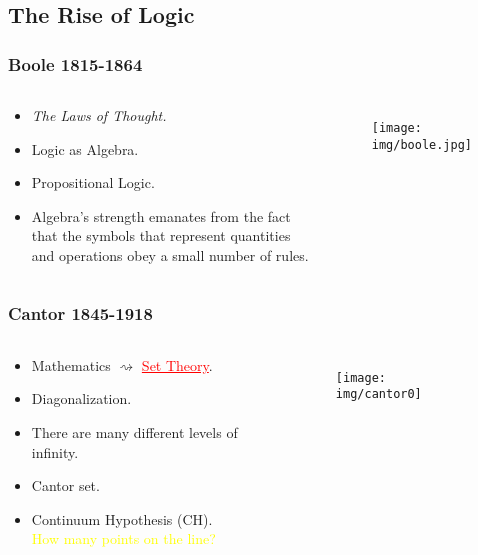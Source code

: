 \documentclass[UTF8,11pt,colorlinks,compress,openany]{beamer}%
\begin{document}
\subsection{The Rise of Logic}

\begin{frame}\frametitle{Boole 1815-1864}
	\begin{columns}
			\begin{block}{}
				\begin{itemize}
					\item \emph{The Laws of Thought.}
					\item Logic as Algebra.
					\item Propositional Logic.
					\item Algebra's strength emanates from the fact that the symbols that represent quantities and operations obey a small number of rules.
				\end{itemize}
			\end{block}
		\vspace{-2ex}
			\begin{figure}
				\texttt{[image: img/boole.jpg]}
			\end{figure}
	\end{columns}
\end{frame}

\begin{frame}\frametitle{Cantor 1845-1918}
	\begin{columns}
		\column{0.72\textwidth}
			\begin{center}
				\begin{block}{}
					\begin{itemize}
						\item Mathematics $\rightsquigarrow$ \textcolor{red}{\underline{Set Theory}}.
						\item Diagonalization.
						\item There are many different levels of infinity.
						\item Cantor set.
						\item Continuum Hypothesis (CH).\\
						\textcolor{yellow}{How many points on the line?}
					\end{itemize}
				\end{block}
			\end{center}
		\column{0.2\textwidth}
			\begin{figure}
				\texttt{[image: img/cantor0]}
			\end{figure}
	\end{columns}
\end{frame}
\end{document}
